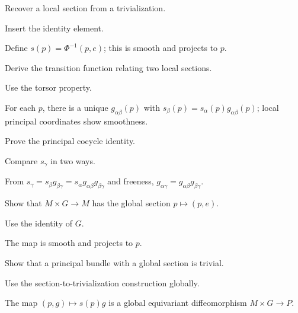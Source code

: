\begin{exercise}\label{exr:vii08-05}
Recover a local section from a trivialization.
\end{exercise}
\begin{hint}
Insert the identity element.
\end{hint}
\begin{solution}
Define \(s(p)=\Phi^{-1}(p,e)\); this is smooth and projects to \(p\).
\end{solution}

\begin{exercise}\label{exr:vii08-06}
Derive the transition function relating two local sections.
\end{exercise}
\begin{hint}
Use the torsor property.
\end{hint}
\begin{solution}
For each \(p\), there is a unique \(g_{\alpha\beta}(p)\) with \(s_\beta(p)=s_\alpha(p)g_{\alpha\beta}(p)\); local principal coordinates show smoothness.
\end{solution}

\begin{exercise}\label{exr:vii08-07}
Prove the principal cocycle identity.
\end{exercise}
\begin{hint}
Compare \(s_\gamma\) in two ways.
\end{hint}
\begin{solution}
From \(s_\gamma=s_\beta g_{\beta\gamma}=s_\alpha g_{\alpha\beta}g_{\beta\gamma}\) and freeness, \(g_{\alpha\gamma}=g_{\alpha\beta}g_{\beta\gamma}\).
\end{solution}

\begin{exercise}\label{exr:vii08-08}
Show that \(M\times G\to M\) has the global section \(p\mapsto(p,e)\).
\end{exercise}
\begin{hint}
Use the identity of \(G\).
\end{hint}
\begin{solution}
The map is smooth and projects to \(p\).
\end{solution}

\begin{exercise}\label{exr:vii08-09}
Show that a principal bundle with a global section is trivial.
\end{exercise}
\begin{hint}
Use the section-to-trivialization construction globally.
\end{hint}
\begin{solution}
The map \((p,g)\mapsto s(p)g\) is a global equivariant diffeomorphism \(M\times G\to P\).
\end{solution}


